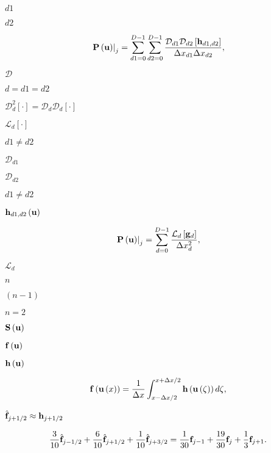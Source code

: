 \documentclass{article}
\begin{document}
$d1$
\pagebreak

$d2$
\pagebreak

\begin{equation} \left.{\bf P}\left({\bf u}\right)\right|_j = \sum_{d1=0}^{D-1} \sum_{d2=0}^{D-1} \frac { \mathcal{D}_{d1}\mathcal{D}_{d2} \left[ {\bf h}_{d1,d2} \right] } {\Delta x_{d1} \Delta x_{d2}}, \end{equation}
\pagebreak

$\mathcal{D}$
\pagebreak

$d = d1 = d2$
\pagebreak

$\mathcal{D}^2_d\left[\cdot\right] = \mathcal{D}_{d}\mathcal{D}_{d}\left[\cdot\right]$
\pagebreak

$\mathcal{L}_d\left[\cdot\right]$
\pagebreak

$d1 \ne d2 $
\pagebreak

$\mathcal{D}_{d1}$
\pagebreak

$\mathcal{D}_{d2}$
\pagebreak

$ d1 \ne d2 $
\pagebreak

${\bf h}_{d1,d2}\left({\bf u}\right)$
\pagebreak

\begin{equation} \left.{\bf P}\left({\bf u}\right)\right|_j = \sum_{d=0}^{D-1} \frac { \mathcal{L}_d \left[ {\bf g}_d \right] } {\Delta x_d^2}, \end{equation}
\pagebreak

$\mathcal{L}_d$
\pagebreak

$n$
\pagebreak

$(n-1)$
\pagebreak

$n=2$
\pagebreak

${\bf S}\left({\bf u}\right)$
\pagebreak

${\bf f}\left({\bf u}\right)$
\pagebreak

${\bf h}\left({\bf u}\right)$
\pagebreak

\begin{equation} {\bf f}\left({\bf u}\left(x\right)\right) = \frac{1}{\Delta x} \int_{x-\Delta x/2}^{x+\Delta x/2} {\bf h}\left({\bf u}\left(\zeta\right)\right)d\zeta, \end{equation}
\pagebreak

$\hat{\bf f}_{j+1/2} \approx {\bf h}_{j+1/2}$
\pagebreak

\begin{align} \frac{3}{10}\hat{\bf f}_{j-1/2} + \frac{6}{10}\hat{\bf f}_{j+1/2} + \frac{1}{10}\hat{\bf f}_{j+3/2} = \frac{1}{30}{\bf f}_{j-1} + \frac{19}{30}{\bf f}_j + \frac{1}{3}{\bf f}_{j+1}. \end{align}
\pagebreak
\end{document}
